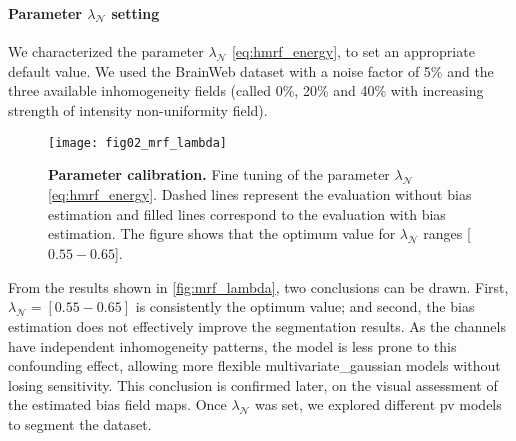 \paragraph{Parameter $\lambda_{\mathcal{N}}$ setting}
We characterized the parameter $\lambda_{\mathcal{N}}$ \eqref{eq:hmrf_energy},
  to set an appropriate default value.
We used the BrainWeb dataset with a noise factor of 5\% and the three available
  inhomogeneity fields (called 0\%, 20\% and 40\% with increasing 
  strength of intensity non-uniformity field).
\begin{figure*}
	\texttt{[image: fig02\_mrf\_lambda]}
	\caption{\textbf{Parameter calibration.} Fine tuning of the parameter $\lambda_{\mathcal{N}}$ 
	\eqref{eq:hmrf_energy}. Dashed lines represent the evaluation without bias estimation and 
	filled lines correspond to the evaluation with bias estimation. The figure shows that the
	optimum value for $\lambda_{\mathcal{N}}$ ranges [$0.55-0.65$].
	}
	\label{fig:mrf_lambda}
\end{figure*}  
From the results shown in \autoref{fig:mrf_lambda}, two conclusions
  can be drawn.
First, $\lambda_\mathcal{N}=[0.55-0.65]$ is consistently the optimum value;
  and second, the bias estimation does not effectively improve the segmentation
  results.
As the channels have independent inhomogeneity patterns, the model is less
  prone to this confounding effect, allowing more flexible \gls*{multivariate_gaussian}
  models without losing sensitivity.
This conclusion is confirmed later, on the visual assessment of the
  estimated bias field maps.
Once $\lambda_\mathcal{N}$ was set, we explored different \gls*{pv} models
  to segment the dataset.

